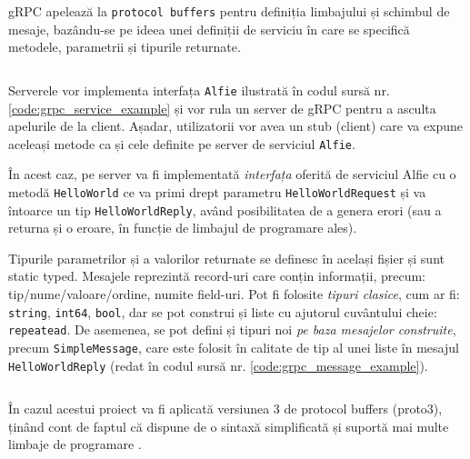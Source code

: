 gRPC apelează la \texttt{protocol buffers} pentru definiția limbajului și schimbul de mesaje, bazându-se pe ideea unei definiții de serviciu în care se specifică metodele, parametrii și tipurile returnate.

\begin{code}
    \inputminted[frame=single,framesep=2mm,linenos,breaklines,tabsize=2]{protobuf}{code/exemplu-serviciu.proto}
    \label{code:grpc_service_example}
\end{code}

Serverele vor implementa interfața \texttt{Alfie} ilustrată în codul sursă nr. \ref{code:grpc_service_example} și vor rula un server de gRPC pentru a asculta apelurile de la client. Așadar, utilizatorii vor avea un stub (client) care va expune aceleași metode ca și cele definite pe server de serviciul \texttt{Alfie}.

În acest caz, pe server va fi implementată \textit{interfața} oferită de serviciul Alfie cu o metodă \texttt{HelloWorld} ce va primi drept parametru \texttt{HelloWorldRequest} și va întoarce un tip \texttt{HelloWorldReply}, având posibilitatea de a genera erori (sau a returna și o eroare, în funcție de limbajul de programare ales).

Tipurile parametrilor și a valorilor returnate se definesc în același fișier și sunt static typed. Mesajele reprezintă record-uri care conțin informații, precum: tip/nume/valoare/ordine, numite field-uri. Pot fi folosite \textit{tipuri clasice}, cum ar fi: \texttt{string}, \texttt{int64}, \texttt{bool}, dar se pot construi și liste cu ajutorul cuvântului cheie: \texttt{repeatead}. De asemenea, se pot defini și tipuri noi \textit{pe baza mesajelor construite}, precum \texttt{SimpleMessage}, care este folosit în calitate de tip al unei liste în mesajul \texttt{HelloWorldReply} (redat în codul sursă nr. \ref{code:grpc_message_example}).

\begin{code}
    \inputminted[frame=single,framesep=2mm,linenos,breaklines,tabsize=2]{protobuf}{code/exemplu-mesaje.proto}
    \label{code:grpc_message_example}
\end{code}

În cazul acestui proiect va fi aplicată versiunea 3 de protocol buffers (proto3), ținând cont de faptul că dispune de o sintaxă simplificată și suportă mai multe limbaje de programare \cite{grpcIntro}.

